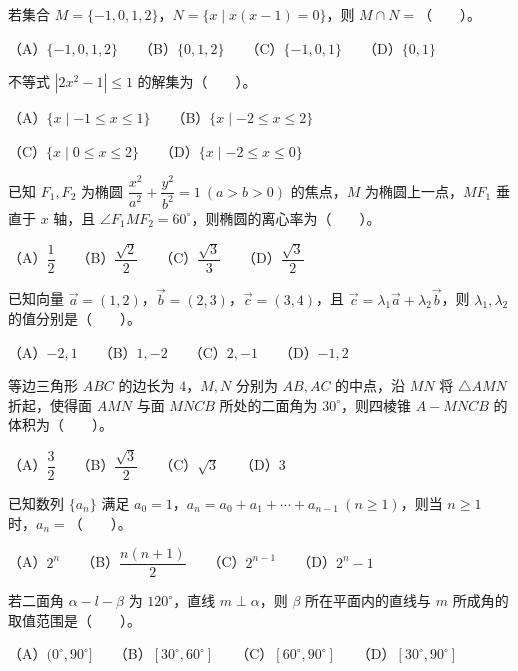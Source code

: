 \begin{question}
若集合 $M=\{-1,0,1,2\}$，$N=\{x\mid x(x-1)=0\}$，则 $M\cap N=$\mbox{（　　）}。

（A）$\{-1,0,1,2\}$　　（B）$\{0,1,2\}$　　（C）$\{-1,0,1\}$　　（D）$\{0,1\}$

\end{question}
\begin{question}
不等式 $|2x^2-1|\leq 1$ 的解集为\mbox{（　　）}。

（A）$\{x\mid -1\leq x\leq 1\}$　　（B）$\{x\mid -2\leq x\leq 2\}$

（C）$\{x\mid 0\leq x\leq 2\}$　　（D）$\{x\mid -2\leq x\leq 0\}$

\end{question}
\begin{question}
已知 $F_1,F_2$ 为椭圆 $\dfrac{x^2}{a^2}+\dfrac{y^2}{b^2}=1\ (a>b>0)$ 的焦点，$M$ 为椭圆上一点，$MF_1$ 垂直于 $x$ 轴，且 $\angle F_1MF_2=60^\circ$，则椭圆的离心率为\mbox{（　　）}。

（A）$\dfrac{1}{2}$　　（B）$\dfrac{\sqrt{2}}{2}$　　（C）$\dfrac{\sqrt{3}}{3}$　　（D）$\dfrac{\sqrt{3}}{2}$

\end{question}
\begin{question}
已知向量 $\vec a=(1,2)$，$\vec b=(2,3)$，$\vec c=(3,4)$，且 $\vec c=\lambda_1\vec a+\lambda_2\vec b$，则 $\lambda_1,\lambda_2$ 的值分别是\mbox{（　　）}。

（A）$-2,1$　　（B）$1,-2$　　（C）$2,-1$　　（D）$-1,2$

\end{question}
\begin{question}
等边三角形 $ABC$ 的边长为 $4$，$M,N$ 分别为 $AB,AC$ 的中点，沿 $MN$ 将 $\triangle AMN$ 折起，使得面 $AMN$ 与面 $MNCB$ 所处的二面角为 $30^\circ$，则四棱锥 $A-MNCB$ 的体积为\mbox{（　　）}。

（A）$\dfrac{3}{2}$　　（B）$\dfrac{\sqrt{3}}{2}$　　（C）$\sqrt{3}$　　（D）$3$

\end{question}
\begin{question}
已知数列 $\{a_n\}$ 满足 $a_0=1$，$a_n=a_0+a_1+\cdots+a_{n-1}\ (n\geq 1)$，则当 $n\geq 1$ 时，$a_n=$\mbox{（　　）}。

（A）$2^n$　　（B）$\dfrac{n(n+1)}{2}$　　（C）$2^{n-1}$　　（D）$2^n-1$

\end{question}
\begin{question}
若二面角 $\alpha-l-\beta$ 为 $120^\circ$，直线 $m\perp\alpha$，则 $\beta$ 所在平面内的直线与 $m$ 所成角的取值范围是\mbox{（　　）}。

（A）$(0^\circ,90^\circ]$　　（B）$[30^\circ,60^\circ]$　　（C）$[60^\circ,90^\circ]$　　（D）$[30^\circ,90^\circ]$

\end{question}
